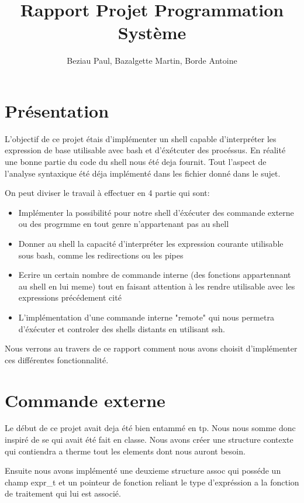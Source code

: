 \documentclass[12pt]{article}
\title{Rapport Projet Programmation Système}
\author{Beziau Paul, Bazalgette Martin, Borde Antoine}
\begin{document}
\maketitle
\tableofcontents

\newpage
\section{Présentation}

L'objectif de ce projet étais d'implémenter un shell capable d'interpréter les expression de base
utilisable avec bash et d'éxétcuter des procéssus. En réalité une bonne partie du code du shell
nous été deja fournit. Tout l'aspect de l'analyse syntaxique été déja implémenté dans les fichier
donné dans le sujet.\newline

On peut diviser le travail à effectuer en 4 partie qui sont:
\begin{itemize}
 \item Implémenter la possibilité pour notre shell d'éxécuter des
 commande externe ou des progrmme en tout genre n'appartenant pas au shell
 \item Donner au shell la capacité d'interpréter les expression courante
 utilisable sous bash, comme les redirections ou les pipes
 \item Ecrire un certain nombre de commande interne (des fonctions appartennant
 au shell en lui meme) tout en faisant attention à les rendre utilisable avec
 les expressions précédement cité
 \item L'implémentation d'une commande interne "remote" qui nous permetra d'éxécuter
 et controler des shells distants en utilisant ssh.\newline 
\end{itemize}

Nous verrons au travers de ce rapport comment nous avons choisit d'implémenter ces différentes
fonctionnalité.

\newpage
\section{Commande externe}
 
 Le début de ce projet avait deja été bien entammé en tp. Nous nous somme donc
 inspiré de se qui avait été fait en classe. Nous avons créer une structure contexte
 qui contiendra a therme tout les elements dont nous auront besoin. 
 
 Ensuite nous avons implémenté une deuxieme structure assoc qui posséde un champ expr\_t
 et un pointeur de fonction reliant le type d'expréssion a la fonction de traitement
 qui lui est associé.
 
\end{document}
